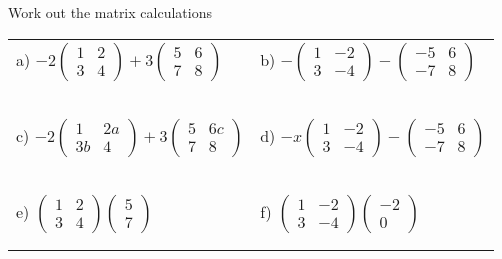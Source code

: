 \documentclass[fontsize=12pt]{scrartcl}
\begin{document}
\newpage
Work out the matrix calculations
\newline
\newline
\begin{tabular}{p{9cm}p{9cm}}
a) $-2\begin{pmatrix}1&2\\3&4 \end{pmatrix}+3\begin{pmatrix}5&6\\7&8 \end{pmatrix}$
&b) $-\begin{pmatrix}1&-2\\3&-4 \end{pmatrix}-\begin{pmatrix}-5&6\\-7&8 \end{pmatrix}$
\\\\\\
\\\\\\

c) $-2\begin{pmatrix}1&2a\\3b&4 \end{pmatrix}+3\begin{pmatrix}5&6c\\7&8 \end{pmatrix}$
&d) $-x\begin{pmatrix}1&-2\\3&-4 \end{pmatrix}-\begin{pmatrix}-5&6\\-7&8 \end{pmatrix}$
\\\\\\
\\\\\\

e) $\begin{pmatrix}1&2\\3&4 \end{pmatrix}\begin{pmatrix}5\\7 \end{pmatrix}$
&f) $\begin{pmatrix}1&-2\\3&-4 \end{pmatrix} \begin{pmatrix}-2\\0 \end{pmatrix}$
\\\\\\
\end{tabular}
\end{document}
